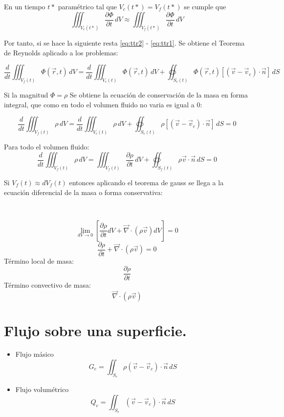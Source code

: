 En un tiempo $t*$ paramétrico tal que $V_c(t*)=V_f(t*)$ se cumple que
\[ \iiint_{V_c(t*)}\frac{\partial \Phi}{\partial t}\,dV\approx \iiint_{V_f(t*)}\frac{\partial \Phi}{\partial t}\,dV\]

Por tanto, si se hace la siguiente resta \eqref{eq:ttr2} - \eqref{eq:ttr1}. Se obtiene el Teorema de Reynolds aplicado a los problemas:

\[\frac{d}{dt}\iiint_{V_f(t)}\Phi(\vec{r},t)\,dV=\frac{d}{dt}\iiint_{V_c(t)}\Phi(\vec{r},t)\,dV+\oiint_{S_c(t)} \Phi(\vec{r},t)\left[(\vec{v}-\vec{v}_c)\cdot\vec{n}\right] \,dS\]



Si la magnitud $\Phi = \rho$ Se obtiene la ecuación de conservación de la masa en forma integral, que como en todo el volumen fluido no varia es igual a 0:

\[\frac{d}{dt}\iiint_{V_f(t)}\rho\,dV=\frac{d}{dt}\iiint_{V_c(t)}\rho\,dV+\oiint_{S_c(t)} \rho\left[(\vec{v}-\vec{v}_c)\cdot\vec{n}\right] \,dS=0\]

Para todo el volumen fluido:
\[\frac{d}{dt}\iiint_{V_f(t)} \rho \,dV=\iiint_{V_f(t)} \frac{\partial \rho}{\partial t} \,dV+\oiint_{S_f(t)} \rho\vec{v}\cdot\vec{n} \,dS=0\]

Si $V_f(t)\approx dV_f(t)$ entonces aplicando el teorema de gauss se llega a la ecuación diferencial de la masa o forma conservativa:

\
\
\
\begin{center}
\end{center}

\[\lim_{dV \to 0}\left[\frac{\partial \rho}{\partial t} dV+\vec{\nabla}\cdot\left(\rho\vec{v}\right)dV\right]=0\]
\[\frac{\partial \rho}{\partial t} +\vec{\nabla}\cdot\left(\rho\vec{v}\right)=0\]
Término local de masa: 
\[\frac{\partial \rho}{\partial t}\]
Término convectivo de masa:
\[\vec{\nabla}\cdot\left(\rho\vec{v}\right)\]

\section{Flujo sobre una superficie.}
\begin{itemize}
	\item Flujo másico
	\[G_e=\iint_{S_e} \rho\left(\vec{v}-\vec{v}_c\right)\cdot\vec{n}\,dS\]
	\item Flujo volumétrico
		\[Q_e=\iint_{S_e} \left(\vec{v}-\vec{v}_c\right)\cdot\vec{n}\,dS\]
\end{itemize}

